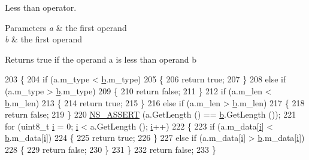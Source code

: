Less than operator. 


\begin{DoxyParams}{Parameters}
{\em a} & the first operand \\
\hline
{\em b} & the first operand \\
\hline
\end{DoxyParams}
\begin{DoxyReturn}{Returns}
true if the operand a is less than operand b 
\end{DoxyReturn}

\begin{DoxyCode}
203 \{
204   \textcolor{keywordflow}{if} (a.m\_type < \hyperlink{buildings__pathloss_8m_a21ad0bd836b90d08f4cf640b4c298e7c}{b}.m\_type)
205     \{
206       \textcolor{keywordflow}{return} \textcolor{keyword}{true};
207     \}
208   \textcolor{keywordflow}{else} \textcolor{keywordflow}{if} (a.m\_type > \hyperlink{buildings__pathloss_8m_a21ad0bd836b90d08f4cf640b4c298e7c}{b}.m\_type)
209     \{
210       \textcolor{keywordflow}{return} \textcolor{keyword}{false};
211     \}
212   \textcolor{keywordflow}{if} (a.m\_len < \hyperlink{buildings__pathloss_8m_a21ad0bd836b90d08f4cf640b4c298e7c}{b}.m\_len)
213     \{
214       \textcolor{keywordflow}{return} \textcolor{keyword}{true};
215     \}
216   \textcolor{keywordflow}{else} \textcolor{keywordflow}{if} (a.m\_len > \hyperlink{buildings__pathloss_8m_a21ad0bd836b90d08f4cf640b4c298e7c}{b}.m\_len)
217     \{
218       \textcolor{keywordflow}{return} \textcolor{keyword}{false};
219     \}
220   \hyperlink{assert_8h_a6dccdb0de9b252f60088ce281c49d052}{NS\_ASSERT} (a.GetLength () == \hyperlink{buildings__pathloss_8m_a21ad0bd836b90d08f4cf640b4c298e7c}{b}.GetLength ());
221   \textcolor{keywordflow}{for} (uint8\_t \hyperlink{bernuolliDistribution_8m_a6f6ccfcf58b31cb6412107d9d5281426}{i} = 0; \hyperlink{bernuolliDistribution_8m_a6f6ccfcf58b31cb6412107d9d5281426}{i} < a.GetLength (); \hyperlink{bernuolliDistribution_8m_a6f6ccfcf58b31cb6412107d9d5281426}{i}++)
222     \{
223       \textcolor{keywordflow}{if} (a.m\_data[\hyperlink{bernuolliDistribution_8m_a6f6ccfcf58b31cb6412107d9d5281426}{i}] < \hyperlink{buildings__pathloss_8m_a21ad0bd836b90d08f4cf640b4c298e7c}{b}.m\_data[\hyperlink{bernuolliDistribution_8m_a6f6ccfcf58b31cb6412107d9d5281426}{i}]) 
224         \{
225           \textcolor{keywordflow}{return} \textcolor{keyword}{true};
226         \}
227       \textcolor{keywordflow}{else} \textcolor{keywordflow}{if} (a.m\_data[\hyperlink{bernuolliDistribution_8m_a6f6ccfcf58b31cb6412107d9d5281426}{i}] > \hyperlink{buildings__pathloss_8m_a21ad0bd836b90d08f4cf640b4c298e7c}{b}.m\_data[\hyperlink{bernuolliDistribution_8m_a6f6ccfcf58b31cb6412107d9d5281426}{i}]) 
228         \{
229           \textcolor{keywordflow}{return} \textcolor{keyword}{false};
230         \}
231     \}
232   \textcolor{keywordflow}{return} \textcolor{keyword}{false};
233 \}
\end{DoxyCode}
